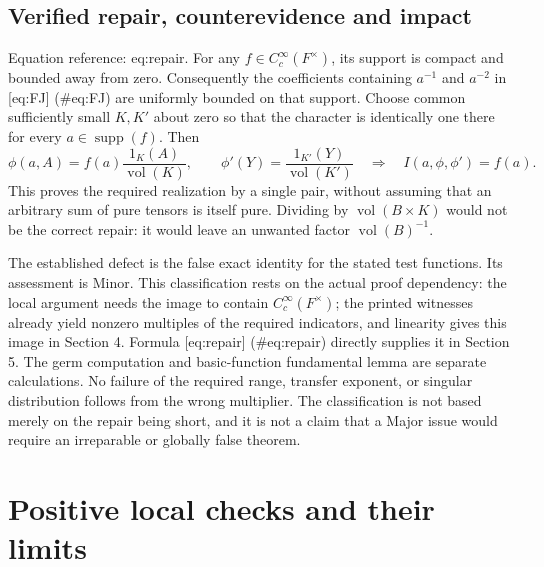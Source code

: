 \documentclass[10pt]{article}
\begin{document}
\subsection*{Verified repair, counterevidence and impact}
Equation reference: eq:repair. For any \(f\in C_c^\infty(F^\times)\), its support is compact and bounded away from zero. Consequently the coefficients containing \(a^{-1}\) and \(a^{-2}\) in [eq:FJ] (\#eq:FJ) are uniformly bounded on that support. Choose common sufficiently small \(K,K'\) about zero so that the character is identically one there for every \(a\in\operatorname{supp}(f)\). Then \[
 \phi(a,A)=f(a)\frac{1_K(A)}{\operatorname{vol}(K)},\qquad
 \phi'(Y)=\frac{1_{K'}(Y)}{\operatorname{vol}(K')}
 \quad\Longrightarrow\quad I(a,\phi,\phi')=f(a).\] This proves the required realization by a single pair, without assuming that an arbitrary sum of pure tensors is itself pure. Dividing by \(\operatorname{vol}(B\times K)\) would not be the correct repair: it would leave an unwanted factor \(\operatorname{vol}(B)^{-1}\).\par
The established defect is the false exact identity for the stated test functions. Its assessment is Minor. This classification rests on the actual proof dependency: the local argument needs the image to contain \(C_c^\infty(F^\times)\); the printed witnesses already yield nonzero multiples of the required indicators, and linearity gives this image in Section 4. Formula [eq:repair] (\#eq:repair) directly supplies it in Section 5. The germ computation and basic-function fundamental lemma are separate calculations. No failure of the required range, transfer exponent, or singular distribution follows from the wrong multiplier. The classification is not based merely on the repair being short, and it is not a claim that a Major issue would require an irreparable or globally false theorem.\par
\section*{Positive local checks and their limits}
\end{document}

